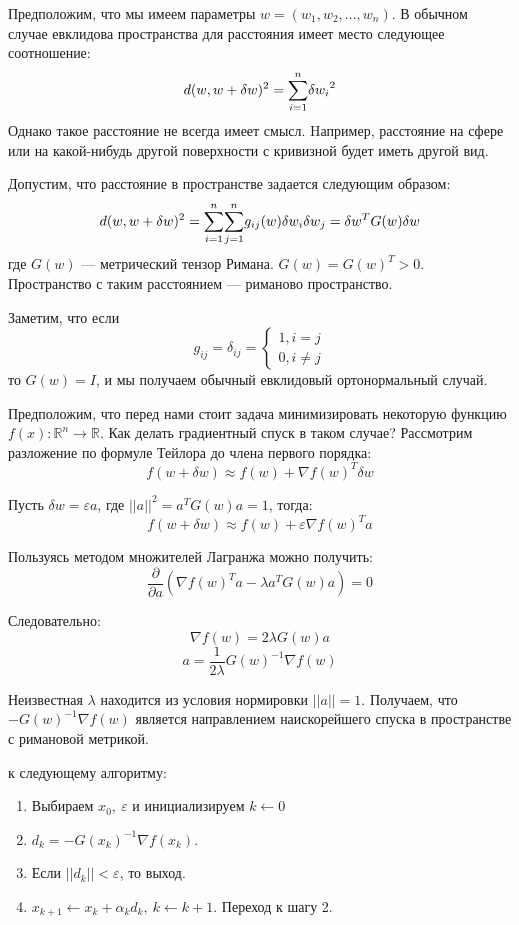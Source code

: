 \documentclass[a4paper,12pt]{article}
\begin{document}
Предположим, что мы имеем параметры $w = (w_1, w_2, ..., w_n)$. В обычном случае евклидова пространства для расстояния имеет место следующее соотношение:
$$d(w, w+\delta w)^2 = \sumfromto{i = 1}{n}{\delta w_i}^2$$
Однако такое расстояние не всегда имеет смысл. Hапример, расстояние на сфере или на какой-нибудь другой поверхности с кривизной будет иметь другой вид.

Допустим, что расстояние в пространстве задается следующим образом:
$$d(w, w+\delta w)^2 = \sumfromto{i = 1}{n}{\sumfromto{j = 1}{n}{g_{ij}(w) \delta w_i \delta w_j}} = \delta w^T G(w) \delta w$$
где $G(w)$ --- метрический тензор Римана. $G(w) = G(w)^T > 0$. Пространство с таким расстоянием --- риманово пространство.

Заметим, что если 
$$
    g_{ij} = \delta_{ij} = 
    \left\{ 
        \begin{aligned} 
            1, i = j \\ 
            0, i \neq j 
        \end{aligned} 
    \right.
$$
то $G(w) = I$, и мы получаем обычный евклидовый ортонормальный случай.

Предположим, что перед нами стоит задача минимизировать некоторую функцию $f(x) : \mathbb{R}^{n} \rightarrow \mathbb{R}$.
Как делать градиентный спуск в таком случае?
Рассмотрим разложение по формуле Тейлора до члена первого порядка:
$$f(w + \delta w) \approx f(w) + \nabla{f(w)}^T {\delta w}$$

Пусть $\delta w = \varepsilon a$, где $||a||^2 = a^TG(w)a = 1$, тогда:
$$f(w + \delta w) \approx f(w) + \varepsilon \nabla{f(w)}^T a$$

Пользуясь методом множителей Лагранжа можно получить:
$$\frac{\partial}{\partial a} (\nabla{f(w)}^Ta - \lambda a^TG(w)a) = 0$$

\newpage
Следовательно:
$$\nabla{f(w)} = 2\lambda G(w)a$$
$$a = \frac{1}{2 \lambda} G(w)^{-1}\nabla{f(w)}$$

Неизвестная $\lambda$ находится из условия нормировки $||a|| = 1$.
Получаем, что $-G(w)^{-1}\nabla{f(w)}$ является направлением наискорейшего спуска в пространстве с римановой метрикой.

 к следующему алгоритму:
\begin{enumerate}
    \item Выбираем $x_0, ~ \varepsilon $ и инициализируем $k \leftarrow 0$
    \item $d_k = -G(x_k)^{-1}\nabla{f(x_k)}$.
    \item Если $||d_k|| < \varepsilon$, то выход.
    \item $x_{k+1} \leftarrow x_{k} + \alpha_k d_k, ~ k \leftarrow k + 1$. Переход к шагу 2. 
\end{enumerate}
\end{document}
